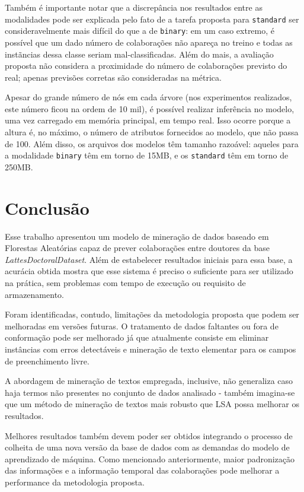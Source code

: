 \documentclass[12pt]{article}
\begin{document}
Também é importante notar que a discrepância nos resultados entre as modalidades pode ser explicada pelo fato de a tarefa proposta para \texttt{standard} ser consideravelmente mais difícil do que a de \texttt{binary}: em um caso extremo, é possível que um dado número de colaborações não apareça no treino e todas as instãncias dessa classe seriam mal-classificadas.
Além do mais, a avaliação proposta não considera a proximidade do número de colaborações previsto do real; apenas previsões corretas são consideradas na métrica.

Apesar do grande número de nós em cada árvore (nos experimentos realizados, este número ficou na ordem de 10 mil), é possível realizar inferência no modelo, uma vez carregado em memória principal, em tempo real.
Isso ocorre porque a altura é, no máximo, o número de atributos fornecidos ao modelo, que não passa de 100. %
Além disso, os arquivos dos modelos têm tamanho razoável: aqueles para a modalidade \texttt{binary} têm em torno de 15MB, e os \texttt{standard} têm em torno de 250MB.


\section{Conclusão}
\label{sec:conclusion}

Esse trabalho apresentou um modelo de mineração de dados baseado em Florestas Aleatórias capaz de prever colaborações entre doutores da base \emph{LattesDoctoralDataset}.
Além de estabelecer resultados iniciais para essa base, a acurácia obtida mostra que esse sistema é preciso o suficiente para ser utilizado na prática, sem problemas com tempo de execução ou requisito de armazenamento.

Foram identificadas, contudo, limitações da metodologia proposta que podem ser melhoradas em versões futuras.
O tratamento de dados faltantes ou fora de conformação pode ser melhorado já que atualmente consiste em eliminar instâncias com erros detectáveis e mineração de texto elementar para os campos de preenchimento livre.

A abordagem de mineração de textos empregada, inclusive, não generaliza caso haja termos não presentes no conjunto de dados analisado - também imagina-se que um método de mineração de textos mais robusto que LSA possa melhorar os resultados.

Melhores resultados também devem poder ser obtidos integrando o processo de colheita de uma nova versão da base de dados com as demandas do modelo de aprendizado de máquina.
Como mencionado anteriormente, maior padronização das informações e a informação temporal das colaborações pode melhorar a performance da metodologia proposta.



\end{document}
